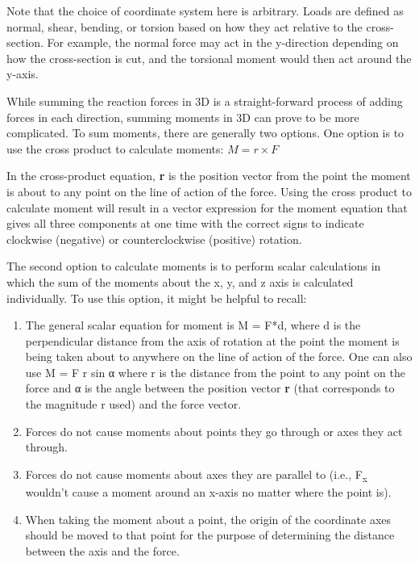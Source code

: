 \documentclass[
  letterpaper,
  DIV=11,
  numbers=noendperiod]{scrreprt}
\begin{document}
Note that the choice of coordinate system here is arbitrary. Loads are
defined as normal, shear, bending, or torsion based on how they act
relative to the cross-section. For example, the normal force may act in
the y-direction depending on how the cross-section is cut, and the
torsional moment would then act around the y-axis.

While summing the reaction forces in 3D is a straight-forward process of
adding forces in each direction, summing moments in 3D can prove to be
more complicated. To sum moments, there are generally two options. One
option is to use the cross product to calculate moments:
\(M=r \times F\)

In the cross-product equation, \textbf{r} is the position vector from
the point the moment is about to any point on the line of action of the
force. Using the cross product to calculate moment will result in a
vector expression for the moment equation that gives all three
components at one time with the correct signs to indicate clockwise
(negative) or counterclockwise (positive) rotation.

The second option to calculate moments is to perform scalar calculations
in which the sum of the moments about the x, y, and z axis is calculated
individually. To use this option, it might be helpful to recall:

\begin{enumerate}
\def\labelenumi{\arabic{enumi}.}
\item
  The general scalar equation for moment is M = F*d, where d is the
  perpendicular distance from the axis of rotation at the point the
  moment is being taken about to anywhere on the line of action of the
  force. One can also use M = F r sin α where r is the distance from the
  point to any point on the force and α is the angle between the
  position vector \textbf{r} (that corresponds to the magnitude r used)
  and the force vector.
\item
  Forces do not cause moments about points they go through or axes they
  act through.
\item
  Forces do not cause moments about axes they are parallel to (i.e.,
  F\textsubscript{x} wouldn't cause a moment around an x-axis no matter
  where the point is).
\item
  When taking the moment about a point, the origin of the coordinate
  axes should be moved to that point for the purpose of determining the
  distance between the axis and the force.
\end{enumerate}
\end{document}
